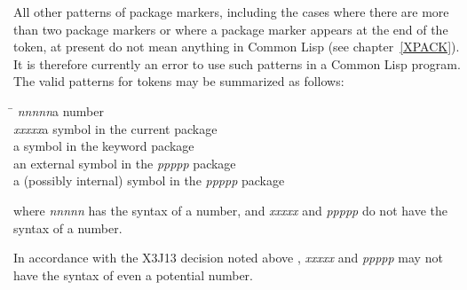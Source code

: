 All other patterns of package markers,
including the cases where there are more than two
package markers or where a package marker appears at the end of the token,
at present do not mean anything in Common Lisp (see chapter~\ref{XPACK}).
It is therefore currently an error to use such patterns in a Common Lisp program.
The valid patterns for tokens may be summarized as follows:
\begin{tabbing}
\hskip 8pc\=\kill
{\it nnnnn}\>a number \\
{\it xxxxx}\>a symbol in the current package \\
\>a symbol in the keyword package \\
\>an external symbol in the {\it ppppp} package \\
\>a (possibly internal) symbol in the {\it ppppp} package
\end{tabbing}
where {\it nnnnn} has the syntax of a number, and {\it xxxxx} and {\it ppppp} do
not have the syntax of a number.

\begin{new}
In accordance with the X3J13 decision noted above
, {\it xxxxx} and {\it ppppp} may not have the syntax of even
a potential number.
\end{new}

